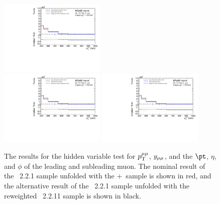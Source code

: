 \begin{figure}[h!]
  \includegraphics[page=564,width=0.45\textwidth]{figures/IBUClosureTests.pdf} \\
  \includegraphics[page=570,width=0.45\textwidth]{figures/IBUClosureTests.pdf}
  \includegraphics[page=576,width=0.45\textwidth]{figures/IBUClosureTests.pdf}
  \caption{The results for the hidden variable test for $p_\mathrm{T}^{\mu\mu}$, $y_{\mu\mu}$, and the $\pt$, $\eta$, and $\phi$ of the leading and subleading muon. The nominal result of the \sherpa~2.2.1 sample unfolded with the \powheg+\pythia~sample is shown in red, and the alternative result of the \sherpa~2.2.1 sample unfolded with the reweighted \sherpa~2.2.11 sample is shown in black.}
  \label{fig:HVTestDilep}
\end{figure}

